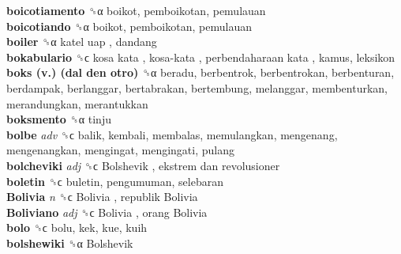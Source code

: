 \textbf{boicotiamento} ␝α  boikot, pemboikotan, pemulauan  \\
\textbf{boicotiando} ␝α  boikot, pemboikotan, pemulauan  \\
\textbf{boiler} ␝α   katel uap , dandang  \\
\textbf{bokabulario} ␝ϲ   kosa kata ,  kosa-kata ,  perbendaharaan kata , kamus, leksikon  \\
\textbf{boks (v.) (dal den otro)} ␝α  beradu, berbentrok, berbentrokan, berbenturan, berdampak, berlanggar, bertabrakan, bertembung, melanggar, membenturkan, merandungkan, merantukkan  \\
\textbf{boksmento} ␝α  tinju  \\
\textbf{bolbe} \emph{adv}  ␝ϲ  balik, kembali, membalas, memulangkan, mengenang, mengenangkan, mengingat, mengingati, pulang  \\
\textbf{bolcheviki} \emph{adj}  ␝ϲ   Bolshevik ,  ekstrem dan revolusioner   \\
\textbf{boletin} ␝ϲ  buletin, pengumuman, selebaran  \\
\textbf{Bolivia} \emph{n}  ␝ϲ   Bolivia ,  republik Bolivia   \\
\textbf{Boliviano} \emph{adj}  ␝ϲ   Bolivia ,  orang Bolivia   \\
\textbf{bolo} ␝ϲ  bolu, kek, kue, kuih  \\
\textbf{bolshewiki} ␝α   Bolshevik   \\
